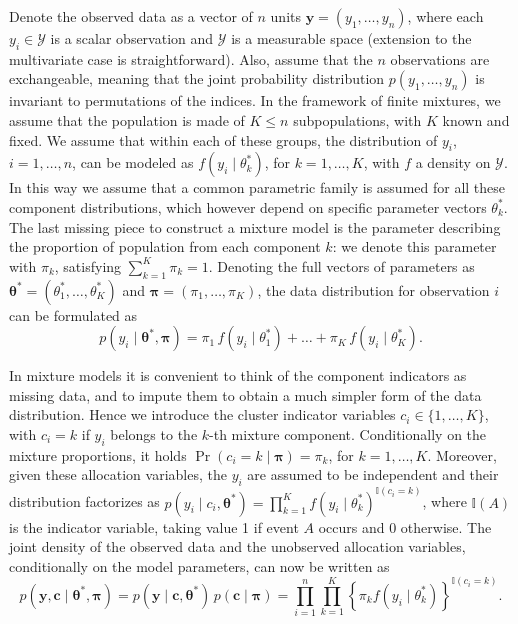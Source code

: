 Denote the observed data as a vector of $n$ units $\bm{y} = (y_1,\dots,y_n)$, where each $y_i \in \mathcal{Y}$ is a scalar observation and $\mathcal{Y}$ is a measurable space (extension to the multivariate case is straightforward). Also, assume that the $n$ observations are exchangeable, meaning that the joint probability distribution $p(y_1,\dots,y_n)$ is invariant to permutations of the indices. In the framework of finite mixtures, we assume that the population is made of $K\leq n$ subpopulations, with $K$ known and fixed.
We assume that within each of these groups, the distribution of $y_i$, $i=1,\dots,n$, can be modeled as $f(y_i \mid \theta_k^*)$, for $k=1,\dots,K$, with $f$ a density on $\mathcal{Y}$. In this way we assume that a common parametric family is assumed for all these component distributions, which however depend on specific parameter vectors $\theta_k^*$.
The last missing piece to construct a mixture model is the parameter describing the proportion of population from each component $k$: we denote this parameter with $\pi_k$, satisfying $\sum_{k=1}^K \pi_k = 1$. Denoting the full vectors of parameters as $\bm{\theta}^* = (\theta_1^*,\dots,\theta_K^*)$ and $\bm{\pi} = (\pi_1,\dots,\pi_K)$, the data distribution for observation $i$ can be formulated as
\begin{equation*}
p(y_i\mid \bm{\theta}^*,\bm{\pi}) = \pi_1 \, f(y_i\mid\theta_1^*) + \dots + \pi_K \, f(y_i\mid\theta_K^*).
\end{equation*}

In mixture models it is convenient to think of the component indicators as missing data, and to impute them to obtain a much simpler form of the data distribution. 
Hence we introduce the cluster indicator variables $c_i\in\{1,\dots,K\}$, with $c_i=k$ if $y_i$ belongs to the $k$-th mixture component.
Conditionally on the mixture proportions, it holds $\Pr(c_i = k \mid \bm{\pi}) = \pi_k$, for $k = 1,\dots,K$. Moreover, given these allocation variables, the $y_i$ are assumed to be independent and their distribution factorizes as $p(y_i\mid c_i,\bm{\theta}^*) = \prod_{k=1}^K f(y_i\mid\theta_k^*)^{\mathbb{I}(c_i = k)}$, where $\mathbb{I}(A)$ is the indicator variable, taking value 1 if event $A$ occurs and 0 otherwise.
%
The joint density of the observed data and the unobserved allocation variables, conditionally on the model parameters, can now be written as 
\begin{equation*}
p(\bm{y},\bm{c}\mid \bm{\theta}^*,\bm{\pi}) = p(\bm{y}\mid\bm{c},\bm{\theta}^*)\, p(\bm{c}\mid\bm{\pi}) = 
\prod_{i=1}^n \prod_{k=1}^K \left\{ \pi_k f(y_i\mid\theta_k^*) \right\}^{\mathbb{I}(c_i = k)}.
\end{equation*}

